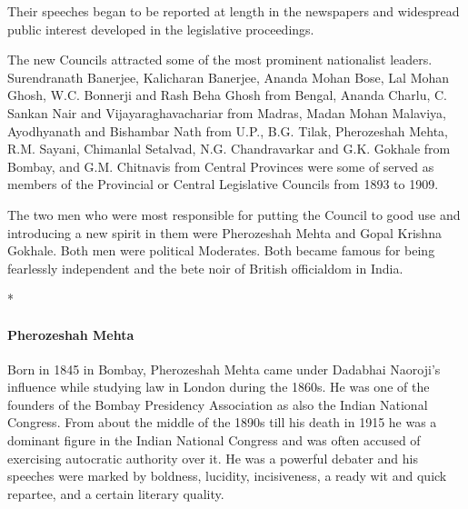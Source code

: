 Their speeches began to be reported at length in the newspapers and widespread public interest developed in the legislative proceedings.

The new Councils attracted some of the most prominent nationalist leaders. Surendranath Banerjee, Kalicharan Banerjee, Ananda Mohan Bose, Lal Mohan Ghosh, W.C. Bonnerji and Rash Beha Ghosh from Bengal, Ananda Charlu, C. Sankan Nair and Vijayaraghavachariar from Madras, Madan Mohan Malaviya, Ayodhyanath and Bishambar Nath from U.P., B.G. Tilak, Pherozeshah Mehta, R.M. Sayani, Chimanlal Setalvad, N.G. Chandravarkar and G.K. Gokhale from Bombay, and G.M. Chitnavis from Central Provinces were some of served as members of the Provincial or Central Legislative Councils from 1893 to 1909.

The two men who were most responsible for putting the Council to good use and introducing a new spirit in them were Pherozeshah Mehta and Gopal Krishna Gokhale. Both men were political Moderates. Both became famous for being fearlessly independent and the bete noir of British officialdom in India.

\begin{center}*\end{center}

\paragraph{Pherozeshah Mehta}

Born in 1845 in Bombay, Pherozeshah Mehta came under Dadabhai Naoroji's influence while studying law in London during the 1860s. He was one of the founders of the Bombay Presidency Association as also the Indian National Congress. From about the middle of the 1890s till his death in 1915 he was a dominant figure in the Indian National Congress and was often accused of exercising autocratic authority over it. He was a powerful debater and his speeches were marked by boldness, lucidity, incisiveness, a ready wit and quick repartee, and a certain literary quality.

